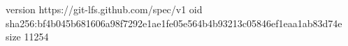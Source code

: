 version https://git-lfs.github.com/spec/v1
oid sha256:bf4b045b681606a98f7292e1ae1fe05e564b4b93213c05846ef1eaa1ab83d74e
size 11254
